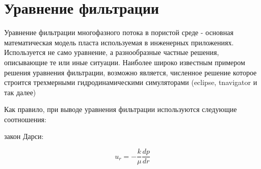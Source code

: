 
\section{Уравнение фильтрации}

Уравнение фильтрации многофазного потока в пористой среде - основная математическая модель пласта используемая в инженерных приложениях. Используется не само уравнение, а разнообразные частные решения, описывающие те или иные ситуации. Наиболее широко известным примером решения уравнения фильтрации, возможно является, численное решение которое строится трехмерными гидродинамическими симуляторами (eclipse, tnavigator и так далее)


Как правило, при выводе уравнения фильтрации используются следующие соотношения:

закон Дарси:  

\begin{equation} \label{eq:darcy_law_1}
 u_r=-\frac{k}{\mu}\frac{dp}{dr} 
\end{equation}


